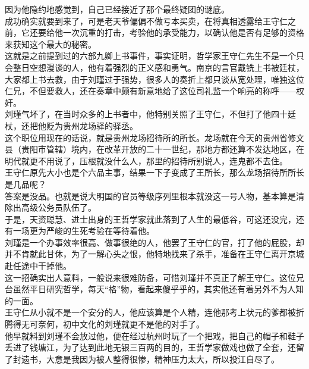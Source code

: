 \begin{multicols}{\theparacolNo}
因为他隐约地感觉到，自己已经接近了那个最终疑团的谜底。\\

成功确实就要到来了，可是老天爷偏偏不做亏本买卖，在将真相透露给王守仁之前，它还要给他一次沉重的打击，考验他的承受能力，以确认他是否有足够的资格来获知这个最大的秘密。\\

这就是之前提到过的六部九卿上书事件，事实证明，哲学家王守仁先生不是一个只会整日空想漫谈的人，他有着强烈的正义感和勇气。南京的言官戴铣上书被廷杖，大家都上书去救，由于刘瑾过于强势，很多人的奏折上都只谈从宽处理，唯独这位仁兄，不但要救人，还在奏章中颇有新意地给了这位司礼监一个响亮的称呼——权奸。\\

刘瑾气坏了，在当时众多的上书者中，他特别关照了王守仁，不但打了他四十廷杖，还把他贬为贵州龙场驿的驿丞。\\

这个职位用现在的话说，就是贵州龙场招待所的所长。龙场就在今天的贵州省修文县（贵阳市管辖）境内，在改革开放的二十一世纪，那地方都还算不发达地区，在明代就更不用说了，压根就没什么人，那里的招待所别说人，连鬼都不去住。\\

王守仁原先大小也是个六品主事，结果一下子变成了王所长，那么龙场招待所所长是几品呢？\\

答案是没品。也就是说大明国的官员等级序列里根本就没这一号人物，基本算是清除出高级公务员队伍了。\\

于是，天资聪慧、进士出身的王哲学家就此落到了人生的最低谷，可这还没完，还有一场更为严峻的生死考验在等待着他。\\

刘瑾是一个办事效率很高、做事很绝的人，他罢了王守仁的官，打了他的屁股，却并不肯就此甘休，为了一解心头之恨，他特地找来了杀手，准备在王守仁离开京城赴任途中干掉他。\\

这一招确实出人意料，一般说来很难防备，可惜刘瑾并不真正了解王守仁。这位兄台虽然平日研究哲学，每天“格”物，看起来傻乎乎的，其实他还有着另外不为人知的一面。\\

王守仁从小就不是一个安分的人，他应该算是个人精，连他那考上状元的爹都被折腾得无可奈何，初中文化的刘瑾就更不是他的对手了。\\

他早就料到刘瑾不会放过他，便在经过杭州时玩了一个把戏，把自己的帽子和鞋子丢进了钱塘江，为了达到此地无银三百两的目的，王哲学家做戏也做了全套，还留了封遗书，大意是我因为被人整得很惨，精神压力太大，所以投江自尽了。\\


\end{multicols}
